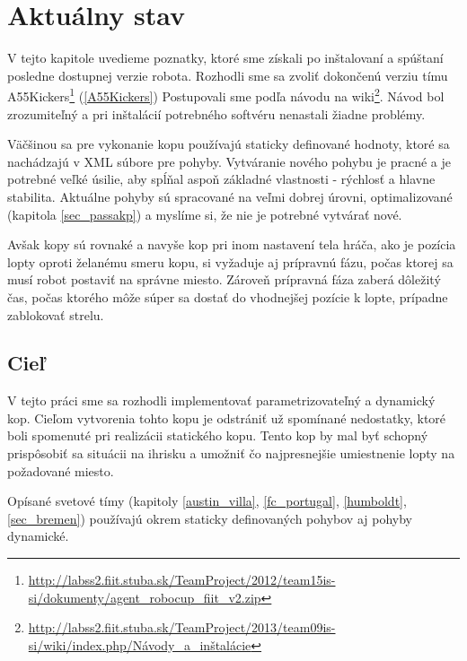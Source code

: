 \section{Aktuálny stav} \label{sec_current}

V tejto kapitole uvedieme poznatky, ktoré sme získali po inštalovaní a spúštaní posledne dostupnej verzie robota. Rozhodli sme sa zvoliť dokončenú verziu tímu A55Kickers\footnote{\url{http://labss2.fiit.stuba.sk/TeamProject/2012/team15is-si/dokumenty/agent_robocup_fiit_v2.zip}} (\ref{A55Kickers}) %
Postupovali sme podľa návodu na wiki\footnote{\url{http://labss2.fiit.stuba.sk/TeamProject/2013/team09is-si/wiki/index.php/Návody_a_inštalácie}}. Návod bol zrozumiteľný a pri inštalácií potrebného softvéru nenastali žiadne problémy.

Väčšinou sa pre vykonanie kopu používajú staticky definované hodnoty, ktoré sa nachádzajú v XML súbore pre pohyby. Vytváranie nového pohybu je pracné a je potrebné veľké úsilie, aby spĺňal aspoň základné vlastnosti - rýchlosť a hlavne stabilita. Aktuálne pohyby sú spracované na veľmi dobrej úrovni, optimalizované (kapitola \ref{sec_passakp}) a myslíme si, že nie je potrebné vytvárať nové.

Avšak kopy sú rovnaké a navyše kop pri inom nastavení tela hráča, ako je pozícia lopty oproti želanému smeru kopu, si vyžaduje aj prípravnú fázu, počas ktorej sa musí robot postaviť na správne miesto. Zároveň prípravná fáza zaberá dôležitý čas, počas ktorého môže súper sa dostať do vhodnejšej pozície k lopte, prípadne zablokovať strelu.

\subsection{Cieľ}

V tejto práci sme sa rozhodli implementovať parametrizovateľný a dynamický kop. Cieľom vytvorenia tohto kopu je odstrániť už spomínané nedostatky, ktoré boli spomenuté pri realizácii statického kopu. Tento kop by mal byť schopný prispôsobiť sa situácii na ihrisku a umožniť čo najpresnejšie umiestnenie lopty na požadované miesto.

Opísané svetové tímy (kapitoly \ref{austin_villa}, \ref{fc_portugal}, \ref{humboldt}, \ref{sec_bremen}) používajú okrem staticky definovaných pohybov aj pohyby dynamické. 

